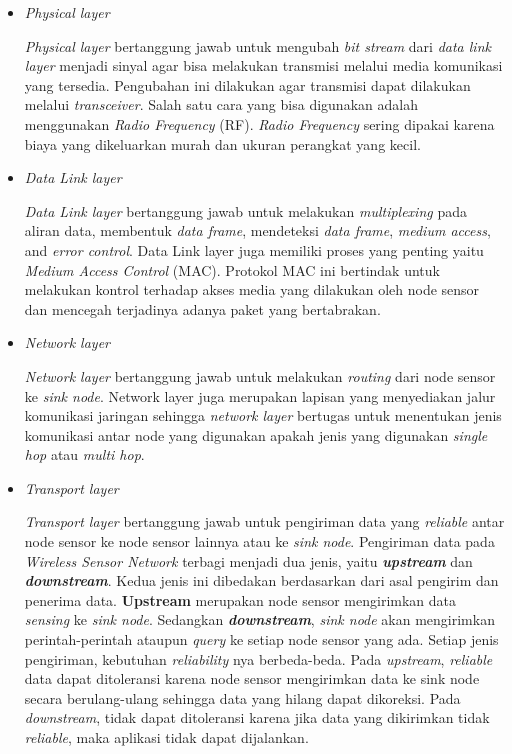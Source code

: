 \begin{itemize}
	\item \textit{Physical layer}
	
	\textit{Physical layer} bertanggung jawab untuk mengubah \textit{bit stream} dari \textit{data link layer} menjadi sinyal agar bisa melakukan transmisi melalui media komunikasi yang tersedia. Pengubahan ini dilakukan agar transmisi dapat dilakukan melalui \textit{transceiver}. Salah satu cara yang bisa digunakan adalah menggunakan \textit{Radio Frequency} (RF). \textit{Radio Frequency} sering dipakai karena biaya yang dikeluarkan murah dan ukuran perangkat yang kecil.	
	
	\item \textit{Data Link layer}
	
	\textit{Data Link layer} bertanggung jawab untuk melakukan \textit{multiplexing} pada aliran data, membentuk \textit{data frame}, mendeteksi \textit{data frame}, \textit{medium access}, and \textit{error control}. Data Link layer juga memiliki proses yang penting yaitu \textit{Medium Access Control} (MAC). Protokol MAC ini bertindak untuk melakukan kontrol terhadap akses media yang dilakukan oleh node sensor dan mencegah terjadinya adanya paket yang bertabrakan.  
	
	\item \textit{Network layer}
	
	\textit{Network layer} bertanggung jawab untuk melakukan \textit{routing} dari node sensor ke \textit{sink node}. Network layer juga merupakan lapisan yang menyediakan jalur komunikasi jaringan sehingga \textit{network layer} bertugas untuk menentukan jenis komunikasi antar node yang digunakan apakah jenis yang digunakan \textit{single hop} atau \textit{multi hop}. 	
	
	\item \textit{Transport layer}
	
	\textit{Transport layer} bertanggung jawab untuk pengiriman data yang \textit{reliable} antar node sensor ke node sensor lainnya atau ke \textit{sink node}. Pengiriman data pada \textit{Wireless Sensor Network} terbagi menjadi dua jenis, yaitu \textit{\textbf{upstream}} dan \textit{\textbf{downstream}}. Kedua jenis ini dibedakan berdasarkan dari asal pengirim dan penerima data. \textbf{Upstream} merupakan node sensor mengirimkan data \textit{sensing} ke \textit{sink node}. Sedangkan \textit{\textbf{downstream}}, \textit{sink node} akan mengirimkan perintah-perintah ataupun \textit{query} ke setiap node sensor yang ada. Setiap jenis pengiriman, kebutuhan \textit{reliability} nya berbeda-beda. Pada \textit{upstream}, \textit{reliable} data dapat ditoleransi karena node sensor mengirimkan data ke sink node secara berulang-ulang sehingga data yang hilang dapat dikoreksi. Pada \textit{downstream}, tidak dapat ditoleransi karena jika data yang dikirimkan tidak \textit{reliable}, maka aplikasi tidak dapat dijalankan.
	

\end{itemize}
